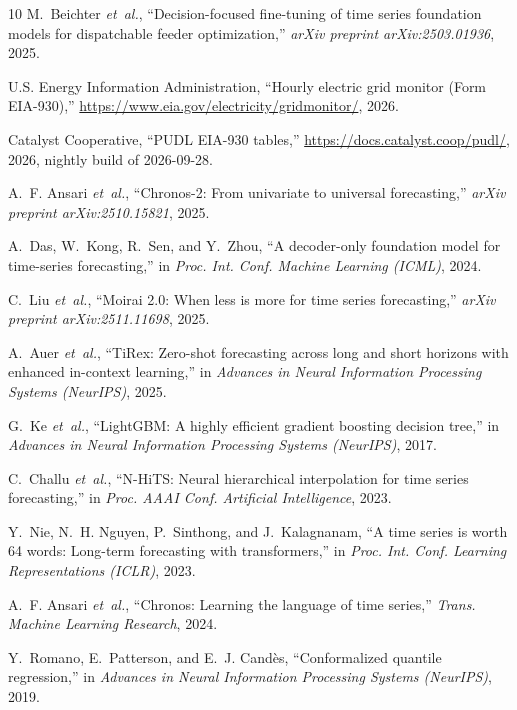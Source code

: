 \documentclass[conference]{IEEEtran}
\begin{document}
\begin{thebibliography}{10}
M.~Beichter \emph{et~al.}, ``Decision-focused
  fine-tuning of time series foundation models for dispatchable feeder
  optimization,'' \emph{arXiv preprint arXiv:2503.01936}, 2025.

{U.S. Energy Information Administration}, ``Hourly electric grid monitor ({Form
  EIA-930}),'' \url{https://www.eia.gov/electricity/gridmonitor/}, 2026.

{Catalyst Cooperative}, ``{PUDL} {EIA-930} tables,'' \url{https://docs.catalyst.coop/pudl/}, 2026, nightly
  build of 2026-09-28.

A.~F. Ansari \emph{et~al.}, ``{Chronos-2}: From univariate to universal
  forecasting,'' \emph{arXiv preprint arXiv:2510.15821}, 2025.

A.~Das, W.~Kong, R.~Sen, and Y.~Zhou, ``A decoder-only foundation model for
  time-series forecasting,'' in \emph{Proc. Int. Conf. Machine Learning
  (ICML)}, 2024.

C.~Liu \emph{et~al.}, ``{Moirai 2.0}: When less is more for time series
  forecasting,'' \emph{arXiv preprint arXiv:2511.11698}, 2025.

A.~Auer \emph{et~al.},
  ``{TiRex}: Zero-shot forecasting across long and short horizons with
  enhanced in-context learning,'' in \emph{Advances in Neural Information
  Processing Systems (NeurIPS)}, 2025.

G.~Ke \emph{et~al.},
  ``{LightGBM}: A highly efficient gradient boosting decision tree,'' in
  \emph{Advances in Neural Information Processing Systems (NeurIPS)}, 2017.

C.~Challu \emph{et~al.}, ``{N-HiTS}: Neural hierarchical
  interpolation for time series forecasting,'' in \emph{Proc. AAAI Conf.
  Artificial Intelligence}, 2023.

Y.~Nie, N.~H. Nguyen, P.~Sinthong, and J.~Kalagnanam, ``A time series is worth
  64 words: Long-term forecasting with transformers,'' in \emph{Proc. Int.
  Conf. Learning Representations (ICLR)}, 2023.

A.~F. Ansari \emph{et~al.}, ``Chronos: Learning the language of time
  series,'' \emph{Trans. Machine Learning Research}, 2024.

Y.~Romano, E.~Patterson, and E.~J. Cand{\`e}s, ``Conformalized quantile
  regression,'' in \emph{Advances in Neural Information Processing Systems
  (NeurIPS)}, 2019.


\end{thebibliography}
\end{document}
